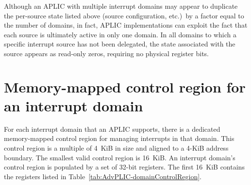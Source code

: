 \begin{commentary}
Although an APLIC with multiple interrupt domains may appear to duplicate
the per-source state listed above (source configuration, etc.)\ by a
factor equal to the number of domains, in fact, APLIC implementations
can exploit the fact that each source is ultimately active in only one
domain.
In all domains to which a specific interrupt source has not been
delegated, the state associated with the source appears as read-only
zeros, requiring no physical register bits.
\end{commentary}

\section{Memory-mapped control region for an interrupt domain}
\label{sec:AdvPLIC-domainControlRegion}

For each interrupt domain that an APLIC supports, there is a dedicated
memory-mapped control region for managing interrupts in that domain.
This control region is a multiple of 4~KiB in size and aligned to a
\mbox{4-KiB} address boundary.
The smallest valid control region is 16~KiB.
An interrupt domain's control region is populated by a set of
\mbox{32-bit} registers.
The first 16~KiB contains the registers listed in
Table~\ref{tab:AdvPLIC-domainControlRegion}.

